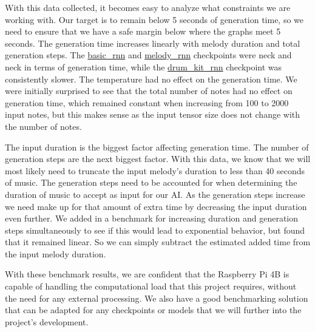 With this data collected, it becomes easy to analyze what constraints we are working
with. Our target is to remain below 5 seconds of generation time, so we need to ensure
that we have a safe margin below where the graphs meet 5 seconds. The generation time
increases linearly with melody duration and total generation steps. The \url{basic_rnn}
and \url{melody_rnn} checkpoints were neck and neck in terms of generation time, while the
\url{drum_kit_rnn} checkpoint was consistently slower. The temperature had no effect on
the generation time. We were initially surprised to see that the total number of notes had
no effect on generation time, which remained constant when increasing from 100 to 2000
input notes, but this makes sense as the input tensor size does not change with the number
of notes.

The input duration is the biggest factor affecting generation time. The number of
generation steps are the next biggest factor. With this data, we know that we will most
likely need to truncate the input melody's duration to less than 40 seconds of music. The
generation steps need to be accounted for when determining the duration of music to accept
as input for our AI. As the generation steps increase we need make up for that amount of
extra time by decreasing the input duration even further. We added in a benchmark for
increasing duration and generation steps simultaneously to see if this would lead to
exponential behavior, but found that it remained linear. So we can simply subtract the
estimated added time from the input melody duration.

With these benchmark results, we are confident that the Raspberry Pi 4B is capable of
handling the computational load that this project requires, without the need for any
external processing. We also have a good benchmarking solution that can be adapted for any
checkpoints or models that we will further into the project's development.

